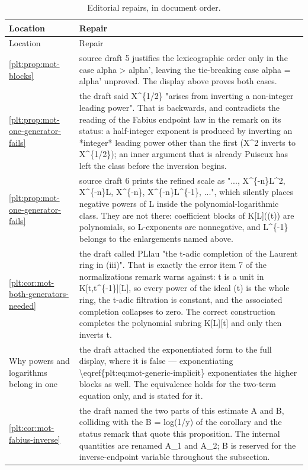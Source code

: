 \documentclass[11pt,oneside]{article}
\theoremstyle{plain}
\theoremstyle{definition}
\theoremstyle{remark}
\begin{document}
\begin{longtable}{@{}p{} p{}@{}}
\caption{Editorial repairs, in document order.}\label{plt:tab:repairs}\\
\toprule
Location & Repair\\
\midrule
\endfirsthead
\toprule
Location & Repair\\
\midrule
\endhead
\cref{plt:prop:mot-blocks} & source draft 5 justifies the lexicographic order only in the case alpha > alpha', leaving the tie-breaking case alpha = alpha' unproved. The display above proves both cases.\\
\cref{plt:prop:mot-one-generator-fails} & the draft said X\textasciicircum \{1/2\} "arises from inverting a non-integer leading power". That is backwards, and contradicts the reading of the Fabius endpoint law in the remark on its status: a half-integer exponent is produced by inverting an *integer* leading power other than the first (X\textasciicircum 2 inverts to X\textasciicircum \{1/2\}); an inner argument that is already Puiseux has left the class before the inversion begins.\\
\cref{plt:prop:mot-one-generator-fails} & source draft 6 prints the refined scale as "..., X\textasciicircum \{-n\}L\textasciicircum 2, X\textasciicircum \{-n\}L, X\textasciicircum \{-n\}, X\textasciicircum \{-n\}L\textasciicircum \{-1\}, ...", which silently places negative powers of L inside the polynomial-logarithmic class. They are not there: coefficient blocks of K[L]((t)) are polynomials, so L-exponents are nonnegative, and L\textasciicircum \{-1\} belongs to the enlargements named above.\\
\cref{plt:cor:mot-both-generators-needed} & the draft called PLlau "the t-adic completion of the Laurent ring in (iii)". That is exactly the error item 7 of the normalizations remark warns against: t is a unit in K[t,t\textasciicircum \{-1\}][L], so every power of the ideal (t) is the whole ring, the t-adic filtration is constant, and the associated completion collapses to zero. The correct construction completes the polynomial subring K[L][t] and only then inverts t.\\
Why powers and logarithms belong in one  & the draft attached the exponentiated form to the full display, where it is false --- exponentiating \textbackslash eqref\{plt:eq:mot-generic-implicit\} exponentiates the higher blocks as well. The equivalence holds for the two-term equation only, and is stated for it.\\
\cref{plt:cor:mot-fabius-inverse} & the draft named the two parts of this estimate A and B, colliding with the B = log(1/y) of the corollary and the status remark that quote this proposition. The internal quantities are renamed A\_1 and A\_2; B is reserved for the inverse-endpoint variable throughout the subsection.\\

\end{longtable}
\end{document}

